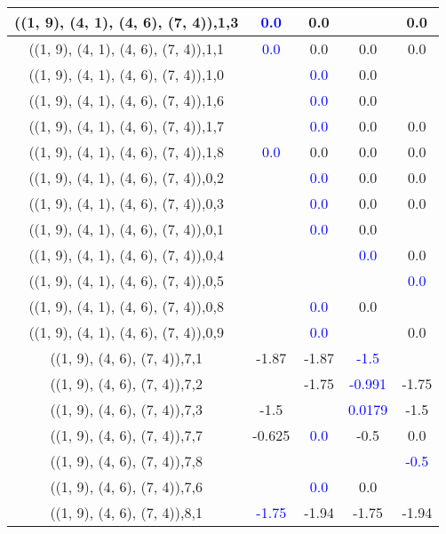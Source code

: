 \documentclass{article}
\begin{document}
\begin{center}
\begin{longtable}{|c|c|c|c|c|}
        	\hline
        	((1, 9), (4, 1), (4, 6), (7, 4)),1,3& \textcolor{blue}{0.0}&0.0&&0.0\\
        	\hline
        	((1, 9), (4, 1), (4, 6), (7, 4)),1,1& \textcolor{blue}{0.0}&0.0&0.0&0.0\\
        	\hline
        	((1, 9), (4, 1), (4, 6), (7, 4)),1,0&& \textcolor{blue}{0.0}&0.0&\\
        	\hline
        	((1, 9), (4, 1), (4, 6), (7, 4)),1,6&& \textcolor{blue}{0.0}&0.0&\\
        	\hline
        	((1, 9), (4, 1), (4, 6), (7, 4)),1,7&& \textcolor{blue}{0.0}&0.0&0.0\\
        	\hline
        	((1, 9), (4, 1), (4, 6), (7, 4)),1,8& \textcolor{blue}{0.0}&0.0&0.0&0.0\\
        	\hline
        	((1, 9), (4, 1), (4, 6), (7, 4)),0,2&& \textcolor{blue}{0.0}&0.0&0.0\\
        	\hline
        	((1, 9), (4, 1), (4, 6), (7, 4)),0,3&& \textcolor{blue}{0.0}&0.0&0.0\\
        	\hline
        	((1, 9), (4, 1), (4, 6), (7, 4)),0,1&& \textcolor{blue}{0.0}&0.0&\\
        	\hline
        	((1, 9), (4, 1), (4, 6), (7, 4)),0,4&&& \textcolor{blue}{0.0}&0.0\\
        	\hline
        	((1, 9), (4, 1), (4, 6), (7, 4)),0,5&&&& \textcolor{blue}{0.0}\\
        	\hline
        	((1, 9), (4, 1), (4, 6), (7, 4)),0,8&& \textcolor{blue}{0.0}&0.0&\\
        	\hline
        	((1, 9), (4, 1), (4, 6), (7, 4)),0,9&& \textcolor{blue}{0.0}&&0.0\\
        	\hline
        	((1, 9), (4, 6), (7, 4)),7,1&-1.87&-1.87& \textcolor{blue}{-1.5}&\\
        	\hline
        	((1, 9), (4, 6), (7, 4)),7,2&&-1.75& \textcolor{blue}{-0.991}&-1.75\\
        	\hline
        	((1, 9), (4, 6), (7, 4)),7,3&-1.5&& \textcolor{blue}{0.0179}&-1.5\\
        	\hline
        	((1, 9), (4, 6), (7, 4)),7,7&-0.625& \textcolor{blue}{0.0}&-0.5&0.0\\
        	\hline
        	((1, 9), (4, 6), (7, 4)),7,8&&&& \textcolor{blue}{-0.5}\\
        	\hline
        	((1, 9), (4, 6), (7, 4)),7,6&& \textcolor{blue}{0.0}&0.0&\\
        	\hline
        	((1, 9), (4, 6), (7, 4)),8,1& \textcolor{blue}{-1.75}&-1.94&-1.75&-1.94\\

\end{longtable}
\end{center}
\end{document}
